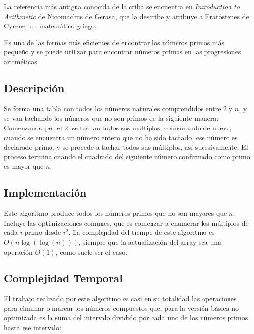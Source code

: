 \documentclass[12pt]{article}
\newcommand{\nl}{\vspace{0.3cm}}
\begin{document}
\nl

La referencia más antigua conocida de la criba se encuentra en \textit{Introduction to Arithmetic}\cite{ngpia} de Nicomachus de Gerasa, que la describe y atribuye a Eratóstenes de Cyrene, un matemático griego.

\nl

Es una de las formas más eficientes de encontrar los números primos más pequeño y se puede utilizar para encontrar números primos en las progresiones aritméticas.\cite{eseapa}

\subsection{Descripción}

\nl

Se forma una tabla con todos los números naturales comprendidos entre $2$ y $n$, y se van tachando los números que no son primos de la siguiente manera: Comenzando por el $2$, se tachan todos sus múltiplos; comenzando de nuevo, cuando se encuentra un número entero que no ha sido tachado, ese número es declarado primo, y se procede a tachar todos sus múltiplos, así sucesivamente. El proceso termina cuando el cuadrado del siguiente número confirmado como primo es mayor que $n$.

\subsection{Implementación}



\newpage

Este algoritmo produce todos los números primos que no son mayores que $n$. Incluye las optimizaciones comunes, que es comenzar a enumerar los múltiplos de cada $i$ primo desde $i^2$. La complejidad del tiempo de este algoritmo es $O(n \log(\log(n)))$\cite{aipns}, siempre que la actualización del array sea una operación $O(1)$, como suele ser el caso.

\nl

\subsection{Complejidad Temporal}

\nl

El trabajo realizado por este algoritmo es casi en su totalidad las operaciones para eliminar o marcar los números compuestos que, para la versión básica no optimizada es la suma del intervalo dividido por cada uno de los números primos hasta ese intervalo:
\end{document}
